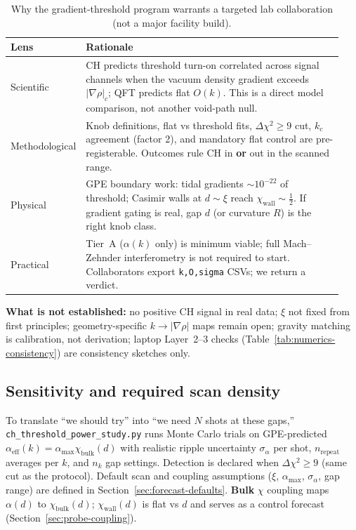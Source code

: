 \documentclass[11pt,a4paper]{article}
\begin{document}
\begin{table}[htbp]
  \centering
  \small
  \caption{Why the gradient-threshold program warrants a targeted lab collaboration (not a major facility build).}
  \label{tab:lab-warrant}
  \begin{tabular}{@{}p{0.14\linewidth}p{0.80\linewidth}@{}}
    \toprule
    Lens & Rationale \\
    \midrule
    Scientific &
    CH predicts threshold turn-on correlated across signal channels when the vacuum density gradient exceeds $|\nabla\rho|_c$; QFT predicts flat $O(k)$. This is a direct model comparison, not another void-path null. \\
    Methodological &
    Knob definitions, flat vs threshold fits, $\Delta\chi^2 \geq 9$ cut, $k_c$ agreement (factor 2), and mandatory flat control are pre-registerable. Outcomes rule CH in \textbf{or} out in the scanned range. \\
    Physical &
    GPE boundary work: tidal gradients $\sim 10^{-22}$ of threshold; Casimir walls at $d \sim \xi$ reach $\chi_{\mathrm{wall}} \sim \tfrac{1}{2}$. If gradient gating is real, gap $d$ (or curvature $R$) is the right knob class. \\
    Practical &
    Tier~A ($\alpha(k)$ only) is minimum viable; full Mach--Zehnder interferometry is not required to start. Collaborators export \texttt{k,O,sigma} CSVs; we return a verdict. \\
    \bottomrule
  \end{tabular}
\end{table}

\textbf{What is not established:} no positive CH signal in real data; $\xi$ not fixed from first principles; geometry-specific $k \to |\nabla\rho|$ maps remain open; gravity matching is calibration, not derivation; laptop Layer~2--3 checks (Table~\ref{tab:numerics-consistency}) are consistency sketches only.

\subsection{Sensitivity and required scan density}
\label{sec:power-study}

To translate ``we should try'' into ``we need $N$ shots at these gaps,'' \texttt{ch\_threshold\_power\_study.py} runs Monte Carlo trials on GPE-predicted $\alpha_{\mathrm{eff}}(k) = \alpha_{\max}\chi_{\mathrm{bulk}}(d)$ with realistic ripple uncertainty $\sigma_\alpha$ per shot, $n_{\mathrm{repeat}}$ averages per $k$, and $n_k$ gap settings.
Detection is declared when $\Delta\chi^2 \geq 9$ (same cut as the protocol).
Default scan and coupling assumptions ($\xi$, $\alpha_{\max}$, $\sigma_\alpha$, gap range) are defined in Section~\ref{sec:forecast-defaults}.
\textbf{Bulk} $\chi$ coupling maps $\alpha(d)$ to $\chi_{\mathrm{bulk}}(d)$; $\chi_{\mathrm{wall}}(d)$ is flat vs $d$ and serves as a control forecast (Section~\ref{sec:probe-coupling}).
\end{document}
